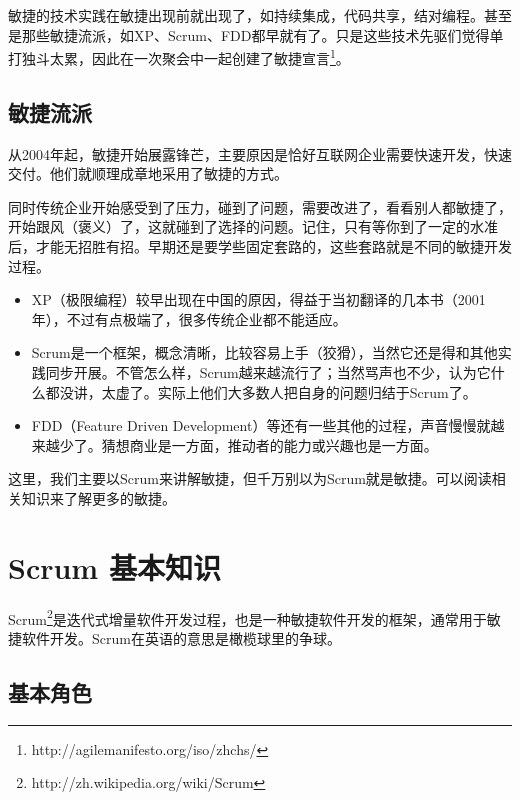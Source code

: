 敏捷的技术实践在敏捷出现前就出现了，如持续集成，代码共享，结对编程。甚至是那些敏捷流派，如XP、Scrum、FDD都早就有了。只是这些技术先驱们觉得单打独斗太累，因此在一次聚会中一起创建了敏捷宣言\footnote{http:/\slash agilemanifesto.org\slash iso\slash zhchs\slash }。

\subsection{敏捷流派}
\label{敏捷流派}

从2004年起，敏捷开始展露锋芒，主要原因是恰好互联网企业需要快速开发，快速交付。他们就顺理成章地采用了敏捷的方式。

同时传统企业开始感受到了压力，碰到了问题，需要改进了，看看别人都敏捷了，开始跟风（褒义）了，这就碰到了选择的问题。记住，只有等你到了一定的水准后，才能无招胜有招。早期还是要学些固定套路的，这些套路就是不同的敏捷开发过程。

\begin{itemize}
\item XP（极限编程）较早出现在中国的原因，得益于当初翻译的几本书（2001年），不过有点极端了，很多传统企业都不能适应。

\item Scrum是一个框架，概念清晰，比较容易上手（狡猾），当然它还是得和其他实践同步开展。不管怎么样，Scrum越来越流行了；当然骂声也不少，认为它什么都没讲，太虚了。实际上他们大多数人把自身的问题归结于Scrum了。

\item FDD（Feature Driven Development）等还有一些其他的过程，声音慢慢就越来越少了。猜想商业是一方面，推动者的能力或兴趣也是一方面。

\end{itemize}

这里，我们主要以Scrum来讲解敏捷，但千万别以为Scrum就是敏捷。可以阅读相关知识来了解更多的敏捷。

\section{Scrum 基本知识}
\label{scrum基本知识}

Scrum\footnote{http:/\slash zh.wikipedia.org\slash wiki\slash Scrum}是迭代式增量软件开发过程，也是一种敏捷软件开发的框架，通常用于敏捷软件开发。Scrum在英语的意思是橄榄球里的争球。

\subsection{基本角色}
\label{基本角色}

